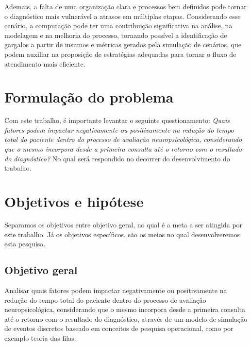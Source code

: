 \documentclass[
    12pt,
    openright,
    oneside,
    a4paper,
    english,
    brazil
]{abntex2}
\begin{document}
Ademais, a falta de uma organização clara e processos bem definidos pode tornar o diagnóstico mais vulnerável a atrasos em múltiplas etapas. Considerando esse cenário, a computação pode ter uma contribuição significativa na análise, na modelagem e na melhoria do processo, tornando possível a identificação de gargalos a partir de insumos e métricas gerados pela simulação de cenários, que podem auxiliar na proposição de estratégias adequadas para tornar o fluxo de atendimento mais eficiente.

\section{Formulação do problema}

Com este trabalho, é importante levantar o seguinte questionamento: \textit{Quais fatores podem impactar negativamente ou positivamente na redução do tempo total do paciente dentro do processo de avaliação neuropsicológica, considerando que o mesmo incorpora desde a primeira consulta até o retorno com o resultado do diagnóstico?} No qual será respondido no decorrer do desenvolvimento do trabalho.

\section{Objetivos e hipótese}

Separamos os objetivos entre objetivo geral, no qual é a meta a ser atingida por este trabalho. Já os objetivos específicos, são os meios no qual desenvolveremos esta pesquisa.

\subsection{Objetivo geral}

Analisar quais fatores podem impactar negativamente ou positivamente na redução do tempo total do paciente dentro do processo de avaliação neuropsicológica, considerando que o mesmo incorpora desde a primeira consulta até o retorno com o resultado do diagnóstico, através de um modelo de simulação de eventos discretos baseado em conceitos de pesquisa operacional, como por exemplo teoria das filas.
\end{document}
